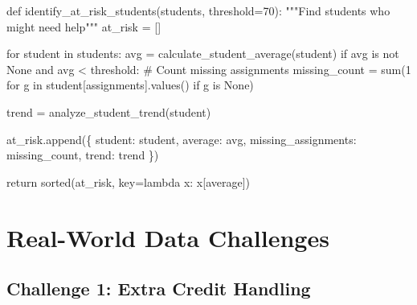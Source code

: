 \documentclass[
  letterpaper,
  DIV=11,
  numbers=noendperiod,
  oneside]{scrreprt}
\newenvironment{Shaded}{}{}
\newcommand{\BuiltInTok}[1]{\textcolor[rgb]{0.84,0.23,0.29}{#1}}
\newcommand{\CommentTok}[1]{\textcolor[rgb]{0.42,0.45,0.49}{#1}}
\newcommand{\ControlFlowTok}[1]{\textcolor[rgb]{0.84,0.23,0.29}{#1}}
\newcommand{\DecValTok}[1]{\textcolor[rgb]{0.00,0.36,0.77}{#1}}
\newcommand{\KeywordTok}[1]{\textcolor[rgb]{0.84,0.23,0.29}{#1}}
\newcommand{\NormalTok}[1]{\textcolor[rgb]{0.14,0.16,0.18}{#1}}
\newcommand{\OperatorTok}[1]{\textcolor[rgb]{0.14,0.16,0.18}{#1}}
\newcommand{\StringTok}[1]{\textcolor[rgb]{0.01,0.18,0.38}{#1}}
\newcommand{\VariableTok}[1]{\textcolor[rgb]{0.89,0.38,0.04}{#1}}
\begin{document}
\begin{Shaded}
\begin{Highlighting}[]
\KeywordTok{def}\NormalTok{ identify\_at\_risk\_students(students, threshold}\OperatorTok{=}\DecValTok{70}\NormalTok{):}
    \CommentTok{"""Find students who might need help"""}
\NormalTok{    at\_risk }\OperatorTok{=}\NormalTok{ []}
    
    \ControlFlowTok{for}\NormalTok{ student }\KeywordTok{in}\NormalTok{ students:}
\NormalTok{        avg }\OperatorTok{=}\NormalTok{ calculate\_student\_average(student)}
        \ControlFlowTok{if}\NormalTok{ avg }\KeywordTok{is} \KeywordTok{not} \VariableTok{None} \KeywordTok{and}\NormalTok{ avg }\OperatorTok{\textless{}}\NormalTok{ threshold:}
            \CommentTok{\# Count missing assignments}
\NormalTok{            missing\_count }\OperatorTok{=} \BuiltInTok{sum}\NormalTok{(}\DecValTok{1} \ControlFlowTok{for}\NormalTok{ g }\KeywordTok{in}\NormalTok{ student[}\StringTok{\textquotesingle{}assignments\textquotesingle{}}\NormalTok{].values() }
                              \ControlFlowTok{if}\NormalTok{ g }\KeywordTok{is} \VariableTok{None}\NormalTok{)}
            
\NormalTok{            trend }\OperatorTok{=}\NormalTok{ analyze\_student\_trend(student)}
            
\NormalTok{            at\_risk.append(\{}
                \StringTok{\textquotesingle{}student\textquotesingle{}}\NormalTok{: student,}
                \StringTok{\textquotesingle{}average\textquotesingle{}}\NormalTok{: avg,}
                \StringTok{\textquotesingle{}missing\_assignments\textquotesingle{}}\NormalTok{: missing\_count,}
                \StringTok{\textquotesingle{}trend\textquotesingle{}}\NormalTok{: trend}
\NormalTok{            \})}
    
    \ControlFlowTok{return} \BuiltInTok{sorted}\NormalTok{(at\_risk, key}\OperatorTok{=}\KeywordTok{lambda}\NormalTok{ x: x[}\StringTok{\textquotesingle{}average\textquotesingle{}}\NormalTok{])}
\end{Highlighting}
\end{Shaded}

\section{Real-World Data Challenges}\label{real-world-data-challenges}

\subsection{Challenge 1: Extra Credit
Handling}\label{challenge-1-extra-credit-handling}
\end{document}
